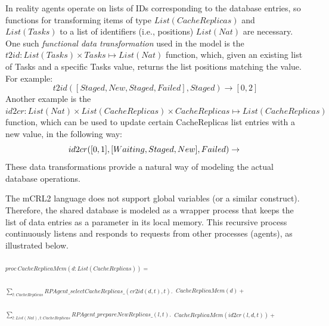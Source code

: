 \documentclass[sort&compress,preprint,3p]{elsarticle}
\begin{document}
In reality agents operate on lists of IDs corresponding to the database
entries, so functions for transforming items of type \begin{math}List(CacheReplicas)\end{math}
and \begin{math}List(Tasks)\end{math}
to a list of identifiers (i.e., positions) 
\begin{math}List(Nat)\end{math} are necessary.
One such \textit{functional data transformation} used in the model is the 
$t2id:List(Tasks)\times Tasks\mapsto List(Nat)$ function, which,
given an existing list of Tasks and a specific Tasks value, returns the list positions
 matching the value.
For example:
\begin{displaymath}
t2id([Staged,New,Staged,Failed],Staged)\rightarrow [0,2] 
\end{displaymath}
Another example is the 
$id2cr:List(Nat)\times List(CacheReplicas)\times CacheReplicas\mapsto List(CacheReplicas)$                                                                                                
function, which can be used to update certain CacheReplicas list entries with a new value, in the following way:
\begin{displaymath}
id2cr([0,1],[Waiting,Staged,New],Failed) \\
 \rightarrow \\
\end{displaymath}
\begin{displaymath}
[Failed,Failed,New]
\end{displaymath}
These data transformations provide a natural way of modeling
the actual database operations.

The mCRL2 language does not support global variables (or a similar construct).
Therefore, the shared database is modeled as a wrapper process
that keeps the list of data entries as a parameter in its local memory. This
recursive process continuously listens and responds
to requests from other processes (agents), as illustrated below.

$_{proc\ CacheReplicaMem(d:List(CacheReplicas)) = }$

$_{\sum_{t:CacheReplicas} RPAgent\_selectCacheReplicas\_(cr2id(d,t),t). } $
$_{CacheReplicaMem(d) +}$

$_{\sum_{l:List(Nat),t:CacheReplicas} RPAgent\_prepareNewReplicas\_(l,t).}$
$_{CacheReplicaMem(id2cr(l,d,t))+}$
\end{document}

